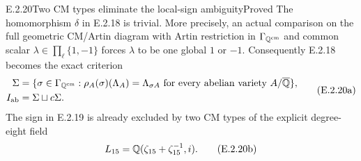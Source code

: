 \begin{result}{E.2.20}{Two CM types eliminate the local-sign ambiguity}{Proved}
The homomorphism \(\delta\) in E.2.18 is trivial. More precisely,
an actual comparison on the full geometric CM/Artin diagram
with Artin restriction in \(\Gamma_{\mathbb Q^{\mathrm{cm}}}\)
and common scalar \(\lambda\in\prod_\ell\{1,-1\}\)
forces \(\lambda\) to be one global \(1\) or \(-1\).
Consequently E.2.18 becomes the exact criterion
\[
 \begin{split}
 \Sigma
  &=\{\sigma\in\Gamma_{\mathbb Q^{\mathrm{cm}}}:
       \rho_A(\sigma)(\Lambda_A)=\Lambda_{\sigma A}
       \text{ for every abelian variety }A/\overline{\mathbb Q}\},\\
 I_{\mathrm{ab}}&=\Sigma\sqcup c\Sigma.
 \end{split}
 \tag{E.2.20a}
\]
The sign in E.2.19 is already excluded by two CM types
of the explicit degree-eight field
\[
 L_{15}=\mathbb Q(\zeta_{15}+\zeta_{15}^{-1},i).
 \tag{E.2.20b}
\]
\end{result}

